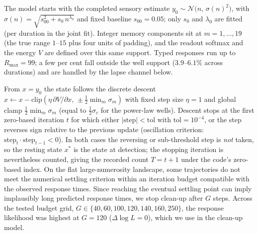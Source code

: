 \documentclass[Afour,sageh,times]{sagej}
\begin{document}
The model starts with the completed sensory estimate $y_0 \sim \mathcal{N}\!\big(n,\,\sigma(n)^2\big)$, with $\sigma(n)=\sqrt{s_{00}^2 + s_0\,n^{\lambda_0}}$ and fixed baseline $s_{00}=0.05$; only $s_0$ and $\lambda_0$ are fitted (per duration in the joint fit). Integer memory components sit at $m=1,\ldots,19$ (the true range $1$--$15$ plus four units of padding), and the readout softmax and the energy $V$ are defined over this same support. Typed responses run up to $R_{\max}=99$; a few per cent fall outside the well support ($3.9$--$6.1\%$ across durations) and are handled by the lapse channel below.

From $x=y_0$ the state follows the discrete descent $x\leftarrow x-\mathrm{clip}(\eta\,\partial V/\partial x,\,\pm\tfrac12\min_m\sigma_m)$ with fixed step size $\eta=1$ and global clamp $\tfrac12\min_m\sigma_m$ (equal to $\tfrac12\sigma_c$ for the power-law wells).
Descent stops at the first zero-based iteration $t$ for which either $|\mathrm{step}|<\mathrm{tol}$ with $\mathrm{tol}=10^{-4}$, or the step reverses sign relative to the previous update (oscillation criterion: $\mathrm{step}_t\cdot\mathrm{step}_{t-1}<0$).
In both cases the reversing or sub-threshold step is \emph{not} taken, so the resting state $x^*$ is the state at detection; the stopping iteration is nevertheless counted, giving the recorded count $T=t+1$ under the code's zero-based index.
On the flat large-numerosity landscape, some trajectories do not meet the numerical settling criterion within an iteration budget compatible with the observed response times. Since reaching the eventual settling point can imply implausibly long predicted response times, we stop clean-up after $G$ steps.
Across the tested budget grid, $G\in\{40,60,100,120,140,160,250\}$, the response likelihood was highest at $G=120$ ($\Delta\log L=0$), which we use in the clean-up model.
\end{document}
